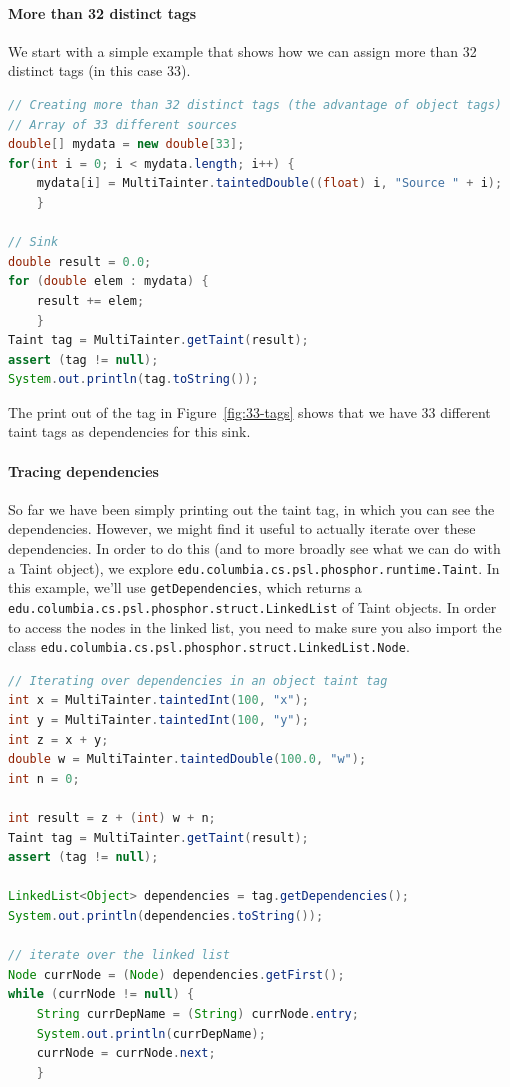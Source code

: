 \documentclass[a4paper]{article}
\begin{document}
\paragraph{More than 32 distinct tags}
We start with a simple example that shows how we can assign more than 32 distinct tags (in this case 33).

\begin{lstlisting}[language=java]
// Creating more than 32 distinct tags (the advantage of object tags)
// Array of 33 different sources
double[] mydata = new double[33];
for(int i = 0; i < mydata.length; i++) {
    mydata[i] = MultiTainter.taintedDouble((float) i, "Source " + i);
    }
    
// Sink
double result = 0.0;
for (double elem : mydata) {
    result += elem;
    }
Taint tag = MultiTainter.getTaint(result);
assert (tag != null);
System.out.println(tag.toString());
\end{lstlisting}

The print out of the tag in Figure~\ref{fig:33-tags} shows that we have 33 different taint tags as dependencies for this sink.



\paragraph{Tracing dependencies}
So far we have been simply printing out the taint tag, in which you can see the dependencies.
However, we might find it useful to actually iterate over these dependencies.
In order to do this (and to more broadly see what we can do with a Taint object),
we explore \verb|edu.columbia.cs.psl.phosphor.runtime.Taint|.
In this example, we'll use \verb|getDependencies|,
which returns a
\\
\verb|edu.columbia.cs.psl.phosphor.struct.LinkedList|
of Taint objects.
In order to access the nodes in the linked list, you need to make sure you also import
the class \verb|edu.columbia.cs.psl.phosphor.struct.LinkedList.Node|.

\begin{lstlisting}[language=java]
// Iterating over dependencies in an object taint tag
int x = MultiTainter.taintedInt(100, "x");
int y = MultiTainter.taintedInt(100, "y");
int z = x + y;
double w = MultiTainter.taintedDouble(100.0, "w");
int n = 0;

int result = z + (int) w + n;
Taint tag = MultiTainter.getTaint(result);
assert (tag != null);

LinkedList<Object> dependencies = tag.getDependencies();
System.out.println(dependencies.toString());

// iterate over the linked list
Node currNode = (Node) dependencies.getFirst();
while (currNode != null) {
    String currDepName = (String) currNode.entry;
    System.out.println(currDepName);
    currNode = currNode.next;
    }
\end{lstlisting}
\end{document}
